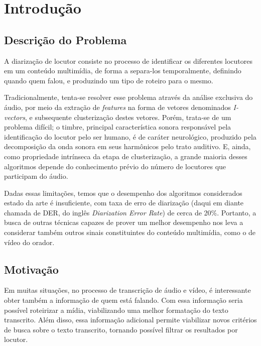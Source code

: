 \chapter{Introdução}

\section{Descrição do Problema}

A diarização de locutor consiste no processo de identificar os diferentes locutores em um conteúdo multimídia, de forma a separa-los temporalmente, definindo quando quem falou, e produzindo um tipo de roteiro para o mesmo.

Tradicionalmente, tenta-se resolver esse problema através da análise exclusiva do áudio, por meio da extração de \textit{features} na forma de vetores denominados \textit{I-vectors}, e subsequente clusterização destes vetores. Porém, trata-se de um problema difícil; o timbre, principal característica sonora responsável pela identificação do locutor pelo ser humano, é de caráter neurológico\cite{oxenhamPitchPerception2012}, produzido pela decomposição da onda sonora em seus harmônicos pelo trato auditivo. E, ainda, como propriedade intrínseca da etapa de clusterização, a grande maioria desses algoritmos depende do conhecimento prévio do número de locutores que participam do áudio. 

Dadas essas limitações, temos que o desempenho dos algoritmos considerados estado da arte é insuficiente, com taxa de erro de diarização (daqui em diante chamada de DER, do inglês \textit{Diarization Error Rate}) de cerca de 20\%\cite{zewoudieUseLongtermFeatures2018}. Portanto, a busca de outras técnicas capazes de prover um melhor desempenho nos leva a considerar também outros sinais constituintes do conteúdo multimídia, como o de vídeo do orador.

\section{Motivação}

Em muitas situações, no processo de transcrição de áudio e vídeo, é interessante obter também a informação de quem está falando. Com essa informação seria possível roteirizar a mídia, viabilizando uma melhor formatação do texto transcrito. Além disso, essa informação adicional permite viabilizar novos critérios de busca sobre o texto transcrito, tornando possível filtrar os resultados por locutor.


